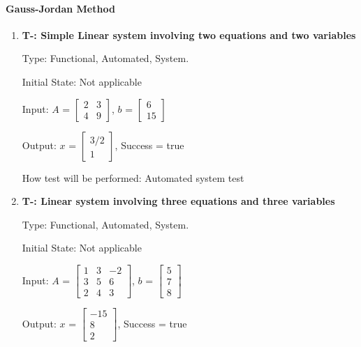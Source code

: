 \documentclass[12pt, titlepage]{article}
\newcounter{tnum}
\begin{document}
\paragraph{Gauss-Jordan Method }

\begin{enumerate}

\item{\textbf{T-\thetnum \label{t-gauss-jordan_simple}:
Simple Linear system involving two equations and two variables}}


Type: Functional, Automated, System.
					
Initial State: Not applicable
					
Input: $A$ = $\begin{bmatrix} 
2 & 3 \\
4 & 9 
\end{bmatrix}$, $b$ = $\begin{bmatrix} 
6 \\
15 
\end{bmatrix}$

Output: $x$ = $\begin{bmatrix} 
3/2\\
1
\end{bmatrix}$, Success = true
					
How test will be performed: Automated system test
					
\item{\textbf{T-\thetnum \label{t-gauss-jordan
elimination_three}: Linear system involving three equations and three
variables}}

Type: Functional, Automated, System.
					
Initial State: Not applicable
					
Input: $A$ =  $\begin{bmatrix} 
1 & 3 & -2 \\
3 & 5 & 6\\
2 & 4 & 3
\end{bmatrix}$, $b$ = $\begin{bmatrix} 
5\\
7\\
8 
\end{bmatrix}$
					
Output: $x$ = $\begin{bmatrix} 
-15\\
8\\
2 
\end{bmatrix}$, Success = true
					

\end{enumerate}
\end{document}
